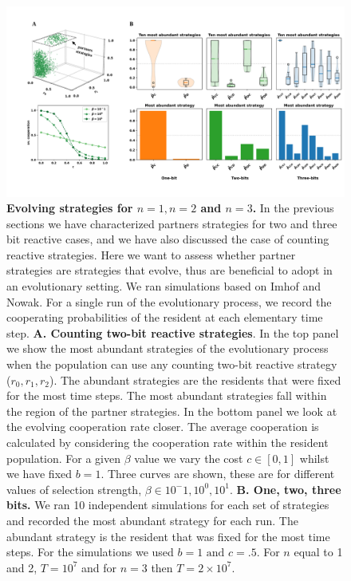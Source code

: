 \documentclass{article}
\theoremstyle{definition}
\begin{document}
\begin{figure}[h!]
  \centering
  \includegraphics[width=\textwidth]{figures/evolutionary_dynamics_one_two_three.pdf}
  \caption{\textbf{Evolving strategies for $n=1, n=2$ and $n=3$.} In the previous sections we have
  characterized partners strategies for two and three bit reactive cases, and we
  have also discussed the case of counting reactive strategies. Here we want to
  assess whether partner strategies are strategies that evolve, thus are beneficial to
  adopt in an evolutionary setting. We ran simulations based on Imhof and Nowak.
  For a single run of the evolutionary process, we record the cooperating
  probabilities of the resident at each elementary time step. \textbf{A. Counting
  two-bit reactive strategies}. In the top panel we show the most abundant
  strategies of the evolutionary process when the population can use any
  counting two-bit reactive strategy ($r_0, r_1, r_2$). The abundant
  strategies are the residents that were fixed for the most time steps.
  The most abundant strategies fall within the region of the partner strategies.
  In the bottom panel we look at the evolving cooperation rate closer. The
  average cooperation is calculated by considering the cooperation rate within
  the resident population. For a given $\beta$ value we vary the cost $c \in [0, 1]$
  whilst we have fixed $b=1$. Three curves are shown, these are for different values
  of selection strength, $\beta \in {10^-1, 10^0, 10^1}$.
  \textbf{B. One, two, three bits.} We ran 10 independent simulations for each
  set of strategies and recorded the most abundant strategy for each run. The
  abundant strategy is the resident that was fixed for the most time steps. For
  the simulations we used \(b=1 \text{ and } c=.5\). For $n$ equal to 1 and
  2, \(T= 10 ^ 7\) and for $n=3$ then \(T= 2 \times10 ^ 7\).}
\end{figure}
\end{document}
